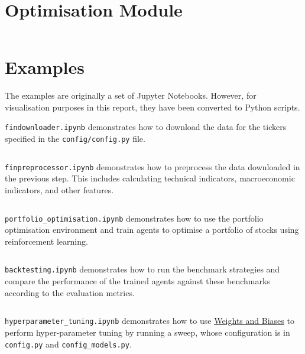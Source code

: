 \section{Optimisation Module}

\inputminted[fontsize=\footnotesize,linenos,breaklines=true,breakanywhere=true,frame=lines,baselinestretch=1]{python}{../optimisation/wandb_opt.py}

\section{Examples}

The examples are originally a set of Jupyter Notebooks. However, for visualisation purposes in this report, they have been converted to Python scripts. 

\texttt{findownloader.ipynb} demonstrates how to download the data for the tickers specified in the \texttt{config/config.py} file.
\inputminted[fontsize=\footnotesize,linenos,breaklines=true,breakanywhere=true,frame=lines,baselinestretch=1]{python}{../examples/findownloader.py}

\texttt{finpreprocessor.ipynb} demonstrates how to preprocess the data downloaded in the previous step. This includes calculating technical indicators, macroeconomic indicators, and other features.
\inputminted[fontsize=\footnotesize,linenos,breaklines=true,breakanywhere=true,frame=lines,baselinestretch=1]{python}{../examples/finpreprocessor.py}

\texttt{portfolio\_optimisation.ipynb} demonstrates how to use the portfolio optimisation environment and train agents to optimise a portfolio of stocks using reinforcement learning.
\inputminted[fontsize=\footnotesize,linenos,breaklines=true,breakanywhere=true,frame=lines,baselinestretch=1]{python}{../examples/portfolio_optimisation.py}

\texttt{backtesting.ipynb} demonstrates how to run the benchmark strategies and compare the performance of the trained agents against these benchmarks according to the evaluation metrics.
\inputminted[fontsize=\footnotesize,linenos,breaklines=true,breakanywhere=true,frame=lines,baselinestretch=1]{python}{../examples/backtesting.py}

\texttt{hyperparameter\_tuning.ipynb} demonstrates how to use \href{https://wandb.ai/site/}{Weights and Biases} to perform hyper-parameter tuning by running a sweep, whose configuration is in \texttt{config.py} and \texttt{config\_models.py}.
\inputminted[fontsize=\footnotesize,linenos,breaklines=true,breakanywhere=true,frame=lines,baselinestretch=1]{python}{../examples/hyperparameter_tuning.py}

